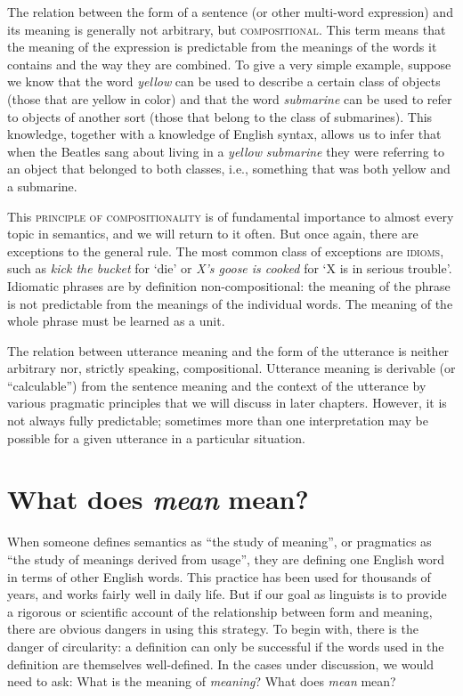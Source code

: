 The relation between the form of a sentence (or other multi-word expression) and its meaning is generally not arbitrary, but \textsc{compositional}. This term means that the meaning of the expression is predictable from the meanings of the words it contains and the way they are combined. To give a very simple example, suppose we know that the word \textit{yellow} can be used to describe a certain class of objects (those that are yellow in color) and that the word \textit{submarine} can be used to refer to objects of another sort (those that belong to the class of submarines). This knowledge, together with a knowledge of English syntax, allows us to infer that when the Beatles sang about living in a \textit{yellow} \textit{submarine} they were referring to an object that belonged to both classes, i.e., something that was both yellow and a submarine.



This \textsc{principle of compositionality} is of fundamental importance to almost every topic in semantics, and we will return to it often. But once again, there are exceptions to the general rule. The most common class of exceptions are \textsc{idioms}, such as \textit{kick the bucket} for ‘die’ or \textit{X’s goose is cooked} for ‘X is in serious trouble’. Idiomatic phrases are by definition non-compositional: the meaning of the phrase is not predictable from the meanings of the individual words. The meaning of the whole phrase must be learned as a unit.



The relation between utterance meaning and the form of the utterance is neither arbitrary nor, strictly speaking, compositional. Utterance meaning is derivable (or “calculable”) from the sentence meaning and the context of the utterance by various pragmatic principles that we will discuss in later chapters. However, it is not always fully predictable; sometimes more than one interpretation may be possible for a given utterance in a particular situation.


\section{What does \textit{mean} mean?}\label{sec:1.4}

When someone defines semantics as “the study of meaning”, or pragmatics as “the study of meanings derived from usage”, they are defining one English word in terms of other English words. This practice has been used for thousands of years, and works fairly well in daily life. But if our goal as linguists is to provide a rigorous or scientific account of the relationship between form and meaning, there are obvious dangers in using this strategy. To begin with, there is the danger of circularity: a definition can only be successful if the words used in the definition are themselves well-defined. In the cases under discussion, we would need to ask: What is the meaning of \textit{meaning}? What does \textit{mean} mean?



